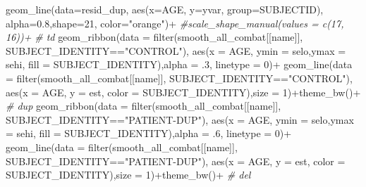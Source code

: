 \documentclass[
]{article}
\newenvironment{Shaded}{\begin{snugshade}}{\end{snugshade}}
\newcommand{\AttributeTok}[1]{\textcolor[rgb]{0.77,0.63,0.00}{#1}}
\newcommand{\CommentTok}[1]{\textcolor[rgb]{0.56,0.35,0.01}{\textit{#1}}}
\newcommand{\DecValTok}[1]{\textcolor[rgb]{0.00,0.00,0.81}{#1}}
\newcommand{\FloatTok}[1]{\textcolor[rgb]{0.00,0.00,0.81}{#1}}
\newcommand{\FunctionTok}[1]{\textcolor[rgb]{0.00,0.00,0.00}{#1}}
\newcommand{\NormalTok}[1]{#1}
\newcommand{\SpecialCharTok}[1]{\textcolor[rgb]{0.00,0.00,0.00}{#1}}
\newcommand{\StringTok}[1]{\textcolor[rgb]{0.31,0.60,0.02}{#1}}
\begin{document}
\begin{Shaded}
\begin{Highlighting}[]
    \FunctionTok{geom\_line}\NormalTok{(}\AttributeTok{data=}\NormalTok{resid\_dup, }\FunctionTok{aes}\NormalTok{(}\AttributeTok{x=}\NormalTok{AGE, }\AttributeTok{y=}\NormalTok{yvar, }\AttributeTok{group=}\NormalTok{SUBJECTID), }\AttributeTok{alpha=}\FloatTok{0.8}\NormalTok{,}\AttributeTok{shape=}\DecValTok{21}\NormalTok{, }\AttributeTok{color=}\StringTok{"orange"}\NormalTok{)}\SpecialCharTok{+}
    \CommentTok{\#scale\_shape\_manual(values = c(17, 16))+}
    \CommentTok{\# td }
    \FunctionTok{geom\_ribbon}\NormalTok{(}\AttributeTok{data =} \FunctionTok{filter}\NormalTok{(smooth\_all\_combat[[name]], SUBJECT\_IDENTITY}\SpecialCharTok{==}\StringTok{"CONTROL"}\NormalTok{),}
                \FunctionTok{aes}\NormalTok{(}\AttributeTok{x =}\NormalTok{ AGE, }\AttributeTok{ymin =}\NormalTok{ selo,}\AttributeTok{ymax =}\NormalTok{ sehi, }\AttributeTok{fill =}\NormalTok{ SUBJECT\_IDENTITY),}\AttributeTok{alpha =}\NormalTok{ .}\DecValTok{3}\NormalTok{, }\AttributeTok{linetype =} \DecValTok{0}\NormalTok{)}\SpecialCharTok{+}
    \FunctionTok{geom\_line}\NormalTok{(}\AttributeTok{data =} \FunctionTok{filter}\NormalTok{(smooth\_all\_combat[[name]], SUBJECT\_IDENTITY}\SpecialCharTok{==}\StringTok{"CONTROL"}\NormalTok{),}
              \FunctionTok{aes}\NormalTok{(}\AttributeTok{x =}\NormalTok{ AGE, }\AttributeTok{y =}\NormalTok{ est, }\AttributeTok{color =}\NormalTok{ SUBJECT\_IDENTITY),}\AttributeTok{size =} \DecValTok{1}\NormalTok{)}\SpecialCharTok{+}\FunctionTok{theme\_bw}\NormalTok{()}\SpecialCharTok{+}
    \CommentTok{\# dup}
    \FunctionTok{geom\_ribbon}\NormalTok{(}\AttributeTok{data =} \FunctionTok{filter}\NormalTok{(smooth\_all\_combat[[name]], SUBJECT\_IDENTITY}\SpecialCharTok{==}\StringTok{"PATIENT{-}DUP"}\NormalTok{),}
                \FunctionTok{aes}\NormalTok{(}\AttributeTok{x =}\NormalTok{ AGE, }\AttributeTok{ymin =}\NormalTok{ selo,}\AttributeTok{ymax =}\NormalTok{ sehi, }\AttributeTok{fill =}\NormalTok{ SUBJECT\_IDENTITY),}\AttributeTok{alpha =}\NormalTok{ .}\DecValTok{6}\NormalTok{, }\AttributeTok{linetype =} \DecValTok{0}\NormalTok{)}\SpecialCharTok{+}
    \FunctionTok{geom\_line}\NormalTok{(}\AttributeTok{data =} \FunctionTok{filter}\NormalTok{(smooth\_all\_combat[[name]], SUBJECT\_IDENTITY}\SpecialCharTok{==}\StringTok{"PATIENT{-}DUP"}\NormalTok{),}
              \FunctionTok{aes}\NormalTok{(}\AttributeTok{x =}\NormalTok{ AGE, }\AttributeTok{y =}\NormalTok{ est, }\AttributeTok{color =}\NormalTok{ SUBJECT\_IDENTITY),}\AttributeTok{size =} \DecValTok{1}\NormalTok{)}\SpecialCharTok{+}\FunctionTok{theme\_bw}\NormalTok{()}\SpecialCharTok{+}
    \CommentTok{\# del}

\end{Highlighting}
\end{Shaded}
\end{document}
